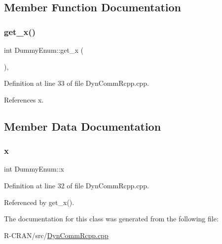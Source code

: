 \subsection{Member Function Documentation}
\mbox{\label{classDummyEnum_a527da769af75620d1443857d2f300433}} 
\subsubsection{\texorpdfstring{get\+\_\+x()}{get\_x()}}
{\footnotesize\ttfamily int Dummy\+Enum\+::get\+\_\+x (\begin{DoxyParamCaption}{ }\end{DoxyParamCaption})\hspace{0.3cm}{\ttfamily [inline]}, {\ttfamily [private]}}



Definition at line 33 of file Dyn\+Comm\+Rcpp.\+cpp.



References x.



\subsection{Member Data Documentation}
\mbox{\label{classDummyEnum_a0ad78287e6a1d56038b13370f313946c}} 
\subsubsection{\texorpdfstring{x}{x}}
{\footnotesize\ttfamily int Dummy\+Enum\+::x\hspace{0.3cm}{\ttfamily [private]}}



Definition at line 32 of file Dyn\+Comm\+Rcpp.\+cpp.



Referenced by get\+\_\+x().



The documentation for this class was generated from the following file\+:\begin{DoxyCompactItemize}
\item 
R-\/\+C\+R\+A\+N/src/\hyperlink{DynCommRcpp_8cpp}{Dyn\+Comm\+Rcpp.\+cpp}\end{DoxyCompactItemize}
